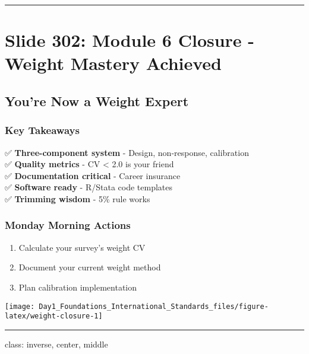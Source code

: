 \documentclass[
]{article}
\providecommand{\tightlist}{%
  \setlength{\itemsep}{0pt}\setlength{\parskip}{0pt}}
\begin{document}
\begin{center}\rule{0.5\linewidth}{0.5pt}\end{center}

\section{Slide 302: Module 6 Closure - Weight Mastery
Achieved}\label{slide-302-module-6-closure---weight-mastery-achieved}

\subsection{You're Now a Weight Expert}\label{youre-now-a-weight-expert}

\subsubsection{Key Takeaways}\label{key-takeaways}

✅ \textbf{Three-component system} - Design, non-response, calibration\\
✅ \textbf{Quality metrics} - CV \textless{} 2.0 is your friend\\
✅ \textbf{Documentation critical} - Career insurance\\
✅ \textbf{Software ready} - R/Stata code templates\\
✅ \textbf{Trimming wisdom} - 5\% rule works

\subsubsection{Monday Morning Actions}\label{monday-morning-actions}

\begin{enumerate}
\def\labelenumi{\arabic{enumi}.}
\tightlist
\item
  Calculate your survey's weight CV
\item
  Document your current weight method
\item
  Plan calibration implementation
\end{enumerate}

\texttt{[image: Day1\_Foundations\_International\_Standards\_files/figure-latex/weight-closure-1]}

\begin{center}\rule{0.5\linewidth}{0.5pt}\end{center}

class: inverse, center, middle
\end{document}
